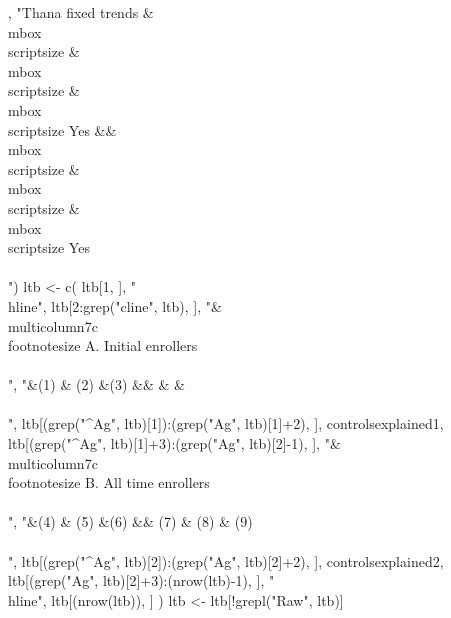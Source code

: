 \begin{Schunk}
\begin{Sinput}
    , 
    "Thana fixed trends & \\mbox{\\scriptsize } & \\mbox{\\scriptsize } & \\mbox{\\scriptsize Yes} && \\mbox{\\scriptsize } & \\mbox{\\scriptsize } & \\mbox{\\scriptsize Yes}\\\\[1.5ex]")
ltb <- c(
  ltb[1, ], "\\hline",
  ltb[2:grep("cline", ltb), ],
  "&\\multicolumn{7}{c}{\\footnotesize A. Initial enrollers}\\\\", 
    "&(1) & (2) &(3) &&  &  & \\\\",
  ltb[(grep("^Ag", ltb)[1]):(grep("Ag", ltb)[1]+2), ],
  controlsexplained1, 
  ltb[(grep("^Ag", ltb)[1]+3):(grep("Ag", ltb)[2]-1), ],
  "&\\multicolumn{7}{c}{\\footnotesize B. All time enrollers}\\\\", 
    "&(4) & (5) &(6) && (7) & (8) & (9)\\\\", 
  ltb[(grep("^Ag", ltb)[2]):(grep("Ag", ltb)[2]+2), ],
  controlsexplained2, 
  ltb[(grep("Ag", ltb)[2]+3):(nrow(ltb)-1), ],
  "\\hline",
  ltb[(nrow(ltb)), ]
  )
ltb <- ltb[!grepl("Raw", ltb)]


\end{Sinput}
\end{Schunk}

